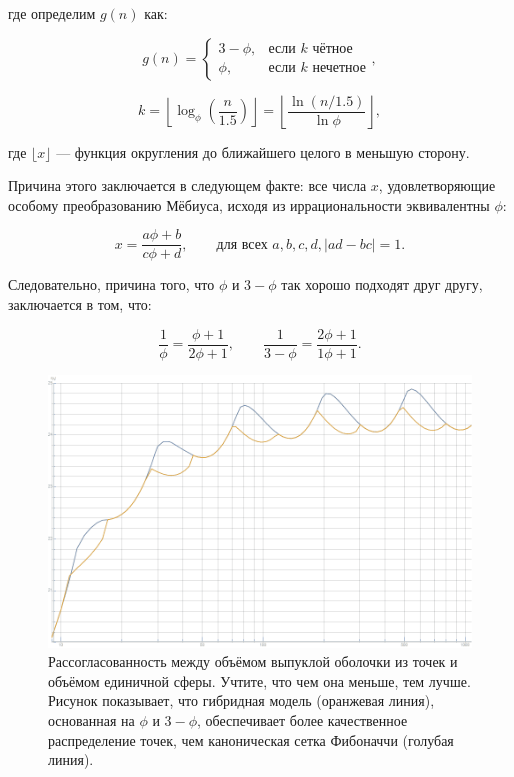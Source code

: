 \documentclass[12pt, a4paper]{article}
\begin{document}
\noindent где определим $g(n)$ как:

\begin{displaymath}
	g(n) =
		\begin{cases}
			3-\phi, & \text{если $k$ чётное} \\
			\phi, & \text{если $k$ нечетное}
		\end{cases},
	\tag{5}
\end{displaymath}

\begin{displaymath}
	k =
		\left\lfloor
			\log_{\phi}(\frac{n}{1.5})
		\right\rfloor
	  =
		\left\lfloor
			\frac{\ln (n/1.5)}{\ln \phi }
		\right\rfloor,
\end{displaymath}

\noindent где $\lfloor x \rfloor$ — функция округления до ближайшего целого в меньшую сторону.

Причина этого заключается в следующем факте: все числа $x$, удовлетворяющие особому преобразованию Мёбиуса, исходя из иррациональности эквивалентны $\phi$:

\begin{displaymath}
	x = \frac{a\phi+b}{c\phi+d}, \qquad \textrm{для всех } a,b,c,d, |ad-bc|=1.
\end{displaymath}

Следовательно, причина того, что $\phi$ и $3-\phi$ так хорошо подходят друг другу, заключается в том, что:

\begin{displaymath}
	\frac{1}{\phi} = \frac{\phi+1}{2\phi+1}, \qquad \frac{1}{3-\phi}= \frac{2\phi+1}{1\phi+1}.
\end{displaymath}

\begin{figure}[H]
    \centering
    \includegraphics[width=\textwidth]{images/4.png}
    \caption{Рассогласованность между объёмом выпуклой оболочки из точек и объёмом единичной сферы. Учтите, что чем она меньше, тем лучше. Рисунок показывает, что гибридная модель (оранжевая линия), основанная на $\phi$ и $3-\phi$, обеспечивает более качественное распределение точек, чем каноническая сетка Фибоначчи (голубая линия).}
\end{figure}
\end{document}
